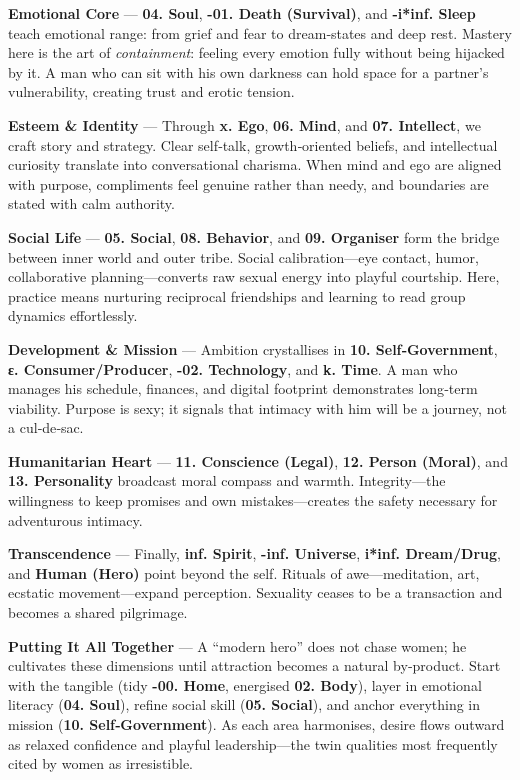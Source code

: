 \documentclass[12pt]{book}
\begin{document}
\bigskip
\textbf{Emotional Core} — \textbf{04. Soul}, \textbf{-01. Death (Survival)}, and \textbf{-i*inf. Sleep} teach emotional range: from grief and fear to dream‑states and deep rest.  Mastery here is the art of \emph{containment}: feeling every emotion fully without being hijacked by it.  A man who can sit with his own darkness can hold space for a partner’s vulnerability, creating trust and erotic tension.

\bigskip
\textbf{Esteem \& Identity} — Through \textbf{x. Ego}, \textbf{06. Mind}, and \textbf{07. Intellect}, we craft story and strategy.  Clear self‑talk, growth‑oriented beliefs, and intellectual curiosity translate into conversational charisma.  When mind and ego are aligned with purpose, compliments feel genuine rather than needy, and boundaries are stated with calm authority.

\bigskip
\textbf{Social Life} — \textbf{05. Social}, \textbf{08. Behavior}, and \textbf{09. Organiser} form the bridge between inner world and outer tribe.  Social calibration—eye contact, humor, collaborative planning—converts raw sexual energy into playful courtship.  Here, practice means nurturing reciprocal friendships and learning to read group dynamics effortlessly.

\bigskip
\textbf{Development \& Mission} — Ambition crystallises in \textbf{10. Self‑Government}, \textbf{ε. Consumer/Producer}, \textbf{-02. Technology}, and \textbf{k. Time}.  A man who manages his schedule, finances, and digital footprint demonstrates long‑term viability.  Purpose is sexy; it signals that intimacy with him will be a journey, not a cul‑de‑sac.

\bigskip
\textbf{Humanitarian Heart} — \textbf{11. Conscience (Legal)}, \textbf{12. Person (Moral)}, and \textbf{13. Personality} broadcast moral compass and warmth.  Integrity—the willingness to keep promises and own mistakes—creates the safety necessary for adventurous intimacy.

\bigskip
\textbf{Transcendence} — Finally, \textbf{inf. Spirit}, \textbf{-inf. Universe}, \textbf{i*inf. Dream/Drug}, and \textbf{Human (Hero)} point beyond the self.  Rituals of awe—meditation, art, ecstatic movement—expand perception.  Sexuality ceases to be a transaction and becomes a shared pilgrimage.

\bigskip
\textbf{Putting It All Together} — A “modern hero” does not chase women; he cultivates these dimensions until attraction becomes a natural by‑product.  Start with the tangible (tidy \textbf{-00. Home}, energised \textbf{02. Body}), layer in emotional literacy (\textbf{04. Soul}), refine social skill (\textbf{05. Social}), and anchor everything in mission (\textbf{10. Self‑Government}).  As each area harmonises, desire flows outward as relaxed confidence and playful leadership—the twin qualities most frequently cited by women as irresistible.


\end{document}

